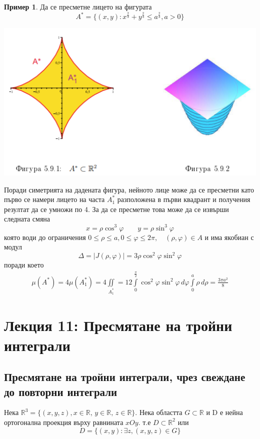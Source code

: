 \documentclass[a4paper,fleqn,12pt]{article}
\theoremstyle{definition}
\newtheorem{example}{Пример}[subsection]
\begin{document}
\begin{example}
Да се пресметне лицето на фигурата
$$A^* = \{(x,y) : x^{\frac{2}{3}} + y^{\frac{2}{3}} \leq a^{\frac{2}{3}}, a>0\}$$
\begin{center}
  \includegraphics{Pics/calc/lec10-1.png}
\end{center}
Поради симетрията на дадената фигура, нейното лице може да се пресметни като първо се намери лицето на часта $A_1 ^*$ разположена в първи квадрант и получения резултат да се умножи по 4. За да се пресметне това може да се извърши следната смяна
$$x = \rho \cos^3 \varphi \qquad y = \rho \sin^3 \varphi $$
която води до ограничения $0 \leq \rho \leq a, 0 \leq \varphi \leq 2\pi, \quad (\rho, \varphi ) \in A$ и има якобиан с модул
$$\Delta = |J (\rho, \varphi ) | = 3\rho \cos^2 \varphi \sin^2 \varphi $$
поради което 
\begin{gather*}
\mu(A^*) = 4\mu(A_1 ^*) = 4 \iint\limits_{A_1 ^*} = 12 \int\limits_{0} ^{\frac{\pi}{2}} \cos^2 \varphi \sin^2 \varphi \, d\varphi \int\limits_0 ^a \rho \, d\rho = \frac{3\pi a^2}{8}
\end{gather*}
\end{example}

\newpage
\section{Лекция 11: Пресмятане на тройни интеграли}

\subsection{Пресмятане на тройни интеграли, чрез свеждане до повторни интеграли}
Нека $\mathbb{R}^3 = \{(x,y,z), x \in \mathbb{R}, \, y \in \mathbb{R}, \, z \in \mathbb{R}\}$. Нека областта $G \subset \mathbb{R}$ и D е нейна ортогонална проекция върху равнината $xOy$. т.е $D \subset \mathbb{R}^2$ или
$$D = \{ (x,y): \exists z, (x,y,z) \in G \}$$
\end{document}
